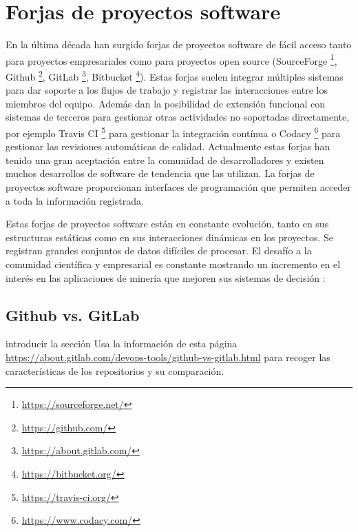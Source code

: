 

\section{Forjas de proyectos software}

 

En la última década han surgido forjas de proyectos software de fácil acceso tanto para proyectos empresariales como para proyectos open source (SourceForge \footnote{\url{https://sourceforge.net/}}, Github \footnote{\url{https://github.com/}}, GitLab \footnote{\url{https://about.gitlab.com/}}, Bitbucket  \footnote{\url{https://bitbucket.org/}}).  Estas forjas suelen integrar múltiples sistemas para dar soporte a los flujos de trabajo y registrar las interacciones entre los miembros del equipo. Además dan la posibilidad de extensión funcional con sistemas de terceros para gestionar otras actividades no soportadas directamente, por ejemplo Travis CI
\footnote{\url{https://travis-ci.org/}} para gestionar la integración contínua o Codacy \footnote{\url{https://www.codacy.com/}} para gestionar las revisiones automáticas de calidad. Actualmente estas forjas han tenido una gran aceptación entre la comunidad de desarrolladores y existen muchos desarrollos de software de tendencia que las utilizan. La forjas de proyectos software proporcionan interfaces de programación que permiten acceder a toda la información registrada. 

Estas forjas de proyectos software están en constante evolución, tanto en sus estructuras estáticas como en sus interacciones dinámicas en los proyectos. Se registran grandes conjuntos de datos difíciles de procesar. El  desafío a la comunidad científica y empresarial  es constante mostrando un incremento en el interés en las aplicaciones de minería que mejoren sus sistemas de decisión \cite{guemes-pena_emerging_2018}:


\subsection{Github vs. GitLab}
\todo introducir la sección
\todo Usa la información de esta página \url{https://about.gitlab.com/devops-tools/github-vs-gitlab.html} para recoger las características de los repositorios 
y su comparación. 
